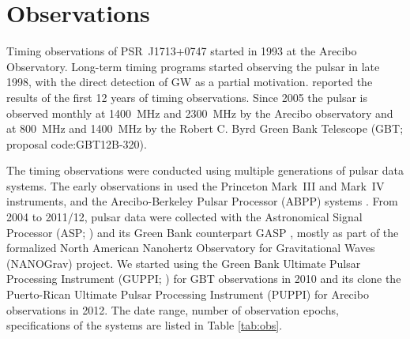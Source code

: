 \section{Observations}
Timing observations of PSR~J1713+0747 started in 1993 at the Arecibo
Observatory. Long-term timing programs started observing the pulsar in
late 1998, with the direct detection of GW as a partial
motivation. \citet{sns+05} reported the results of the first 12 years
of timing observations. Since 2005 the pulsar is observed monthly
at 1400~MHz and 2300~MHz by the Arecibo
observatory and at 800~MHz and 1400~MHz by the Robert C. Byrd Green Bank
Telescope (GBT; proposal code:GBT12B-320).

The timing observations were conducted 
using multiple generations of pulsar data systems. The early 
observations in \citet{sns+05} used
 the Princeton Mark~III \citep{skn+92} and Mark~IV
\citep{sst+00} instruments, and the Arecibo-Berkeley Pulsar Processor
(ABPP) systems \citep{bdz+97}. 
From 2004 to 2011/12, pulsar data were collected with the Astronomical Signal
Processor (ASP; \citealt{dem07}) and its Green Bank counterpart GASP \citep{dem07},
mostly as part of the formalized North American Nanohertz Observatory
for Gravitational Waves (NANOGrav) project. We
started using 
the Green Bank Ultimate Pulsar Processing Instrument (GUPPI; \citealt{GUPPI}) for GBT 
observations in 2010 and its clone the Puerto-Rican Ultimate Pulsar Processing Instrument
(PUPPI) for Arecibo observations in 2012. 
The date range, number of observation epochs, specifications of the
systems are listed in Table \ref{tab:obs}.

